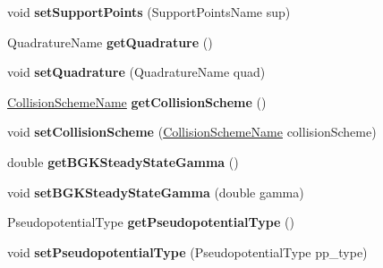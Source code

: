 \begin{DoxyCompactItemize}
\item 
\hypertarget{classnatrium_1_1SolverConfiguration_a1134e478864e6f1dee66b4cb23171a75}{
void {\bfseries setSupportPoints} (SupportPointsName sup)}
\label{classnatrium_1_1SolverConfiguration_a1134e478864e6f1dee66b4cb23171a75}

\item 
\hypertarget{classnatrium_1_1SolverConfiguration_ad2bd74a57c33e8713f4920f299560f8a}{
QuadratureName {\bfseries getQuadrature} ()}
\label{classnatrium_1_1SolverConfiguration_ad2bd74a57c33e8713f4920f299560f8a}

\item 
\hypertarget{classnatrium_1_1SolverConfiguration_afc572729448a368d83236078b1e3d081}{
void {\bfseries setQuadrature} (QuadratureName quad)}
\label{classnatrium_1_1SolverConfiguration_afc572729448a368d83236078b1e3d081}

\item 
\hypertarget{classnatrium_1_1SolverConfiguration_a90e61c6fa9387a1cbf5943674bf307a8}{
\hyperlink{namespacenatrium_a77a27ea835db291372b246db6b4b1578}{CollisionSchemeName} {\bfseries getCollisionScheme} ()}
\label{classnatrium_1_1SolverConfiguration_a90e61c6fa9387a1cbf5943674bf307a8}

\item 
\hypertarget{classnatrium_1_1SolverConfiguration_a5e7241337aa70cbe4b8af29c9cb5cfe8}{
void {\bfseries setCollisionScheme} (\hyperlink{namespacenatrium_a77a27ea835db291372b246db6b4b1578}{CollisionSchemeName} collisionScheme)}
\label{classnatrium_1_1SolverConfiguration_a5e7241337aa70cbe4b8af29c9cb5cfe8}

\item 
\hypertarget{classnatrium_1_1SolverConfiguration_a4ebcfcb30f5cb6efb0d9fb3978b9b90f}{
double {\bfseries getBGKSteadyStateGamma} ()}
\label{classnatrium_1_1SolverConfiguration_a4ebcfcb30f5cb6efb0d9fb3978b9b90f}

\item 
\hypertarget{classnatrium_1_1SolverConfiguration_a040a4e68a3ce9502e39deb343586d62b}{
void {\bfseries setBGKSteadyStateGamma} (double gamma)}
\label{classnatrium_1_1SolverConfiguration_a040a4e68a3ce9502e39deb343586d62b}

\item 
\hypertarget{classnatrium_1_1SolverConfiguration_abd8ff897c0b83035faaa42853692114d}{
PseudopotentialType {\bfseries getPseudopotentialType} ()}
\label{classnatrium_1_1SolverConfiguration_abd8ff897c0b83035faaa42853692114d}

\item 
\hypertarget{classnatrium_1_1SolverConfiguration_a86fc0a490ecda4f46fc2d83ed7d22168}{
void {\bfseries setPseudopotentialType} (PseudopotentialType pp\_\-type)}
\label{classnatrium_1_1SolverConfiguration_a86fc0a490ecda4f46fc2d83ed7d22168}


\end{DoxyCompactItemize}
